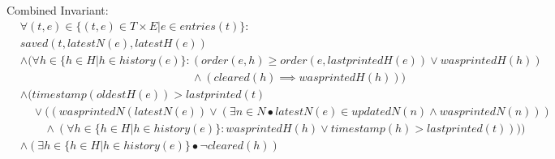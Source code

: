 \documentclass{article}
\begin{document}
Combined Invariant:\\
\begin{align*}
&\forall (t,e) \in \{(t,e) \in T \times E | e \in entries(t)\}: \\
&saved(t, latestN(e), latestH(e)) \\
&\wedge (\forall h \in \{h \in H | h \in history(e)\}: (order(e, h) \geq order(e, lastprintedH(e)) \vee wasprintedH(h)) \\
&\phantom{\wedge (\forall h \in \{h \in H | h \in history(e)\}: } \wedge (cleared(h) \implies wasprintedH(h))) \\
&\wedge (timestamp(oldestH(e)) > lastprinted(t) \\
&\phantom{\wedge ( } \vee ((wasprintedN(latestN(e)) \vee (\exists n \in N \bullet latestN(e) \in updatedN(n) \wedge wasprintedN(n))) \\
&\phantom{\wedge ( \vee ( } \wedge (\forall h \in \{h \in H | h \in history(e)\}: wasprintedH(h) \vee timestamp(h) > lastprinted(t)))) \\
&\wedge (\exists h \in \{h \in H | h \in history(e)\} \bullet \lnot cleared(h))
\end{align*}
\end{document}
